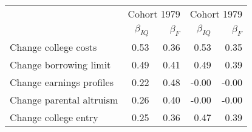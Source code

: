 \begin{tabular}{lrrrr}
\hline
   & \multicolumn{2}{|c|}{Cohort 1979} & \multicolumn{2}{|c|}{Cohort 1979} \\ 
 & $\beta_{IQ}$  & $\beta_{F}$  & $\beta_{IQ}$  & $\beta_{F}$  \\ 
\hline
Change college costs & 0.53  & 0.36  & 0.53  & 0.35  \\ 
Change borrowing limit & 0.49  & 0.41  & 0.49  & 0.39  \\ 
Change earnings profiles & 0.22  & 0.48  & -0.00  & -0.00  \\ 
Change parental altruism & 0.26  & 0.40  & -0.00  & -0.00  \\ 
Change college entry & 0.25  & 0.36  & 0.47  & 0.39  \\ 
\hline
\end{tabular}%
